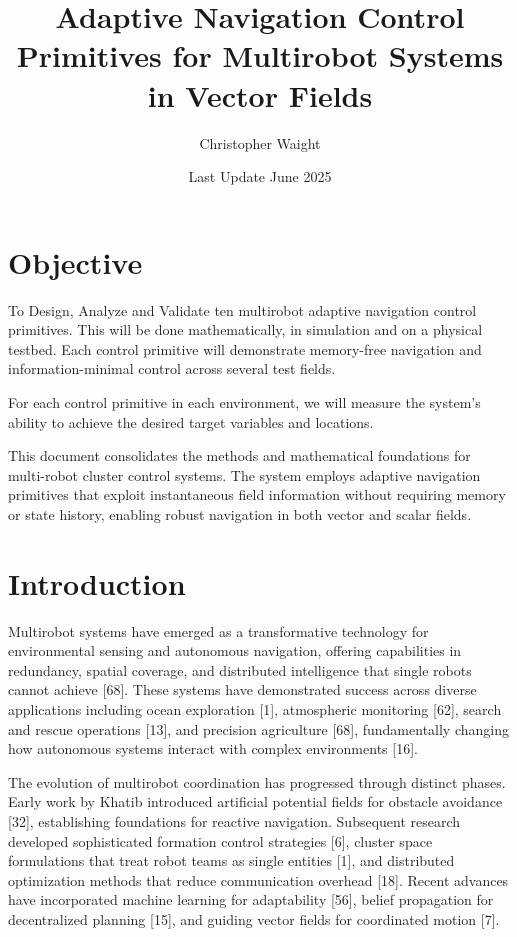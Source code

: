\documentclass{article}
\title{Adaptive Navigation Control Primitives for Multirobot Systems in Vector Fields}
\author{Christopher Waight}
\date{Last Update June 2025}
\begin{document}
\maketitle

\section{Objective}

To Design, Analyze and Validate ten multirobot adaptive navigation control primitives. This will be done mathematically, in simulation and on a physical testbed. Each control primitive will demonstrate memory-free navigation and information-minimal control across several test fields.


For each control primitive in each environment, we will measure the system's ability to achieve the desired target variables and locations.

This document consolidates the methods and mathematical foundations for multi-robot cluster control systems. The system employs adaptive navigation primitives that exploit instantaneous field information without requiring memory or state history, enabling robust navigation in both vector and scalar fields.

\section{Introduction}

Multirobot systems have emerged as a transformative technology for environmental sensing and autonomous navigation, offering capabilities in redundancy, spatial coverage, and distributed intelligence that single robots cannot achieve [68]. These systems have demonstrated success across diverse applications including ocean exploration [1], atmospheric monitoring [62], search and rescue operations [13], and precision agriculture [68], fundamentally changing how autonomous systems interact with complex environments [16].

The evolution of multirobot coordination has progressed through distinct phases. Early work by Khatib introduced artificial potential fields for obstacle avoidance [32], establishing foundations for reactive navigation. Subsequent research developed sophisticated formation control strategies [6], cluster space formulations that treat robot teams as single entities [1], and distributed optimization methods that reduce communication overhead [18]. Recent advances have incorporated machine learning for adaptability [56], belief propagation for decentralized planning [15], and guiding vector fields for coordinated motion [7].
\end{document}
